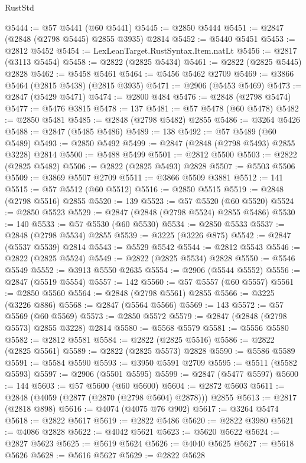 \begin{lexlean}{RustStd}
\begin{coremodule}
@5444 := @57 @5441 (@60 @5441)
@5445 := @2850 @5444
@5451 := @2847 (@2848 (@2798 @5445) @2855 @3935) @2814
@5452 := @5440 @5451
@5453 := @2812 @5452
@5454 := LexLeanTarget.RustSyntax.Item.natLt
@5456 := @2817 (@3113 @5454)
@5458 := @2822 (@2825 @5434)
@5461 := @2822 (@2825 @5445) @2828
@5462 := @5458 @5461
@5464 := @5456 @5462 @2709
@5469 := @3866 @5464 (@2815 @5438) (@2815 @3935)
@5471 := @2906 (@5453 @5469)
@5473 := @2847 (@5429 @5471)
@5474 := @2800 @484
@5476 := @2848 (@2798 @5474)
@5477 := @5476 @3815
@5478 := 137
@5481 := @57 @5478 (@60 @5478)
@5482 := @2850 @5481
@5485 := @2848 (@2798 @5482) @2855
@5486 := @3264 @5426
@5488 := @2847 (@5485 @5486)
@5489 := 138
@5492 := @57 @5489 (@60 @5489)
@5493 := @2850 @5492
@5499 := @2847 (@2848 (@2798 @5493) @2855 @3228) @2814
@5500 := @5488 @5499
@5501 := @2812 @5500
@5503 := @2822 (@2825 @5482)
@5506 := @2822 (@2825 @5493) @2828
@5507 := @5503 @5506
@5509 := @3869 @5507 @2709
@5511 := @3866 @5509 @3881
@5512 := 141
@5515 := @57 @5512 (@60 @5512)
@5516 := @2850 @5515
@5519 := @2848 (@2798 @5516) @2855
@5520 := 139
@5523 := @57 @5520 (@60 @5520)
@5524 := @2850 @5523
@5529 := @2847 (@2848 (@2798 @5524) @2855 @5486)
@5530 := 140
@5533 := @57 @5530 (@60 @5530)
@5534 := @2850 @5533
@5537 := @2848 (@2798 @5534) @2855
@5539 := @3225 (@3226 @875)
@5542 := @2847 (@5537 @5539) @2814
@5543 := @5529 @5542
@5544 := @2812 @5543
@5546 := @2822 (@2825 @5524)
@5549 := @2822 (@2825 @5534) @2828
@5550 := @5546 @5549
@5552 := @3913 @5550 @2635
@5554 := @2906 (@5544 @5552)
@5556 := @2847 (@5519 @5554)
@5557 := 142
@5560 := @57 @5557 (@60 @5557)
@5561 := @2850 @5560
@5564 := @2848 (@2798 @5561) @2855
@5566 := @3225 (@3226 @886)
@5568 := @2847 (@5564 @5566)
@5569 := 143
@5572 := @57 @5569 (@60 @5569)
@5573 := @2850 @5572
@5579 := @2847 (@2848 (@2798 @5573) @2855 @3228) @2814
@5580 := @5568 @5579
@5581 := @5556 @5580
@5582 := @2812 @5581
@5584 := @2822 (@2825 @5516)
@5586 := @2822 (@2825 @5561)
@5589 := @2822 (@2825 @5573) @2828
@5590 := @5586 @5589
@5591 := @5584 @5590
@5593 := @3950 @5591 @2709
@5595 := @5511 (@5582 @5593)
@5597 := @2906 (@5501 @5595)
@5599 := @2847 (@5477 @5597)
@5600 := 144
@5603 := @57 @5600 (@60 @5600)
@5604 := @2872 @5603
@5611 := @2848 (@4059 (@2877 (@2870 (@2798 @5604) @2878))) @2855
@5613 := @2817 (@2818 @898)
@5616 := @4074 (@4075 @76 @902)
@5617 := @3264 @5474
@5618 := @2822 @5617
@5619 := @2822 @5486
@5620 := @2822 @3980
@5621 := @4086 @2828
@5622 := @4042 @5621
@5623 := @5620 @5622
@5624 := @2827 @5623
@5625 := @5619 @5624
@5626 := @4040 @5625
@5627 := @5618 @5626
@5628 := @5616 @5627
@5629 := @2822 @5628

\end{coremodule}
\end{lexlean}

